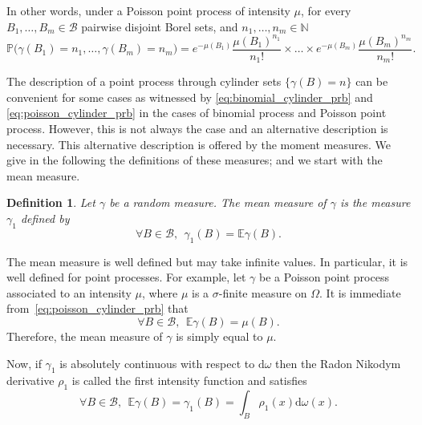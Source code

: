 \documentclass[twoside,11pt]{book}
\newtheorem{definition}{Definition}
\numberwithin{theorem}{chapter}
\numberwithin{definition}{chapter}
\numberwithin{proposition}{chapter}
\numberwithin{corollary}{chapter}
\numberwithin{example}{chapter}
\numberwithin{lemma}{chapter}
\begin{document}
In other words, under a Poisson point process of intensity $\mu$, for every $B_{1}, \dots, B_{m} \in \mathcal{B}$ pairwise disjoint Borel sets, and $n_{1}, \dots, n_{m} \in \mathbb{N}$
\begin{equation}\label{eq:poisson_cylinder_prb}
\mathbb{P} \bigg(\gamma(B_{1}) = n_{1}, \dots, \gamma(B_{m}) = n_{m} \bigg) = e^{- \mu(B_{1})}\frac{ \mu(B_{1})^{n_1}}{n_{1}!} \times \dots \times e^{- \mu(B_{m})}\frac{ \mu(B_{m})^{n_m}}{n_{m}!} .
\end{equation}

The description of a point process through cylinder sets $\{ \gamma(B) = n \}$ can be convenient for some cases as witnessed by \eqref{eq:binomial_cylinder_prb} and \eqref{eq:poisson_cylinder_prb} in the cases of binomial process and Poisson point process. However, this is not always the case and an alternative description is necessary.
This alternative description is offered by the moment measures. We give in the following the definitions of these measures; and we start with the mean measure.  
\begin{definition}
Let $\gamma$ be a random measure. The mean measure of $\gamma$ is the measure $\gamma_{1}$ defined by
\begin{equation}\label{eq:first_intensity_measure}
\forall B \in \mathcal{B}, \:\: \gamma_{1}(B) = \mathbb{E} \gamma(B).
\end{equation}
\end{definition}
The mean measure is well defined but may take infinite values. In particular, it is well defined for point processes. For example, let $\gamma$ be a Poisson point process associated to an intensity $\mu$, where $\mu$ is a $\sigma$-finite measure on $\Omega$. It is immediate from~\eqref{eq:poisson_cylinder_prb} that 
\begin{equation}
\forall B \in \mathcal{B}, \:\: \mathbb{E}\gamma(B) = \mu(B).
\end{equation}
Therefore, the mean measure of $\gamma$ is simply equal to $\mu$.



Now, if $\gamma_{1}$ is absolutely continuous with respect to $\mathrm{d}\omega$ then the Radon Nikodym derivative $\rho_{1}$ is called the first intensity function and satisfies
\begin{equation}\label{eq:first_intensity_function}
\forall B \in \mathcal{B}, \:\:\mathbb{E} \gamma(B) = \gamma_1(B) = \int_{B} \rho_{1}(x) \mathrm{d}\omega(x). 
\end{equation}
\end{document}

